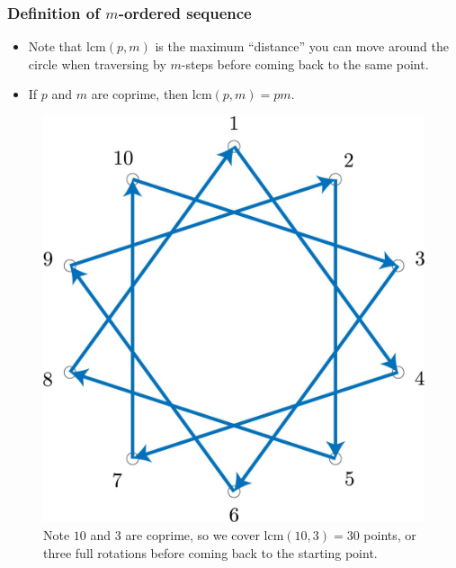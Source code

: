 \documentclass{beamer}
\theoremstyle{plain}
\theoremstyle{definition}
\theoremstyle{remark}
\newcommand{\lcm}{\mathrm{lcm}}
\renewcommand{\'}{\hspace{0.5mm}'}		%
\begin{document}

\begin{frame}
\frametitle{Definition of $m$-ordered sequence}
	\begin{itemize}
		\item Note that $\mathrm{lcm}(p,m)$ is the 
		maximum ``distance'' you can move around the 
		circle when traversing by $m$-steps before
		coming back to the same point. 
		\item If $p$ and $m$ are coprime, then
		$\mathrm{lcm}(p,m) = pm$. 
	\end{itemize}
	\begin{figure}
		\includegraphics[scale=0.08]{circ_10_3.jpg}
		\caption{Note $10$ and $3$ are coprime, so
		we cover $\lcm(10,3) = 30$ points, or three
		full rotations before coming back to the starting point. }
	\end{figure}
	
\end{frame}

\end{document}
